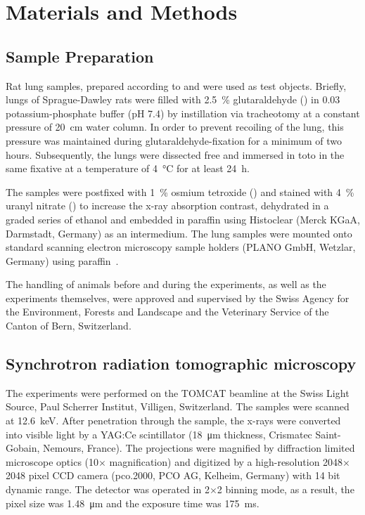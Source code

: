 \documentclass[preprint,s]{iucr}
\begin{document}
\section{Materials and Methods}\label{sec:materials and methods}
\subsection{Sample Preparation}
Rat lung samples, prepared according to  and  were used as test objects. Briefly, lungs of Sprague-Dawley rats were filled with \SI{2.5}{\percent} glutaraldehyde () in \SI{0.03}{\Molar} potassium-phosphate buffer (pH 7.4) by instillation via tracheotomy at a constant pressure of \SI{20}{\centi\meter} water column. In order to prevent recoiling of the lung, this pressure was maintained during glutaraldehyde-fixation for a minimum of two hours. Subsequently, the lungs were dissected free and immersed in toto in the same fixative at a temperature of \SI{4}{\celsius} for at least \SI{24}{\hour}.

The samples were postfixed with \SI{1}{\percent} osmium tetroxide () and stained with \SI{4}{\percent} uranyl nitrate () to increase the x-ray absorption contrast, dehydrated in a graded series of ethanol and embedded in paraffin using Histoclear (Merck KGaA, Darmstadt, Germany) as an intermedium. The lung samples were mounted onto standard scanning electron microscopy sample holders (PLANO GmbH, Wetzlar, Germany) using paraffin~\cite{Tsuda2008}.

The handling of animals before and during the experiments, as well as the experiments themselves, were approved and supervised by the Swiss Agency for the Environment, Forests and Landscape and the Veterinary Service of the Canton of Bern, Switzerland.

\subsection{Synchrotron radiation tomographic microscopy}
The experiments were performed on the TOMCAT beamline at the Swiss Light Source, Paul Scherrer Institut, Villigen, Switzerland. The samples were scanned at \SI{12.6}{\kilo\electronvolt}. After penetration through the sample, the x-rays were converted into visible light by a YAG:Ce scintillator (\SI{18}{\micro\meter} thickness, Crismatec Saint-Gobain, Nemours, France). The projections were magnified by diffraction limited microscope optics (10$\times$ magnification) and digitized by a high-resolution 2048$\times$2048 pixel CCD camera (pco.2000, PCO AG, Kelheim, Germany) with 14 bit dynamic range. The detector was operated in 2$\times$2 binning mode, as a result, the pixel size was \SI{1.48}{\micro\meter} and the exposure time was \SI{175}{\milli\second}.
\end{document}
